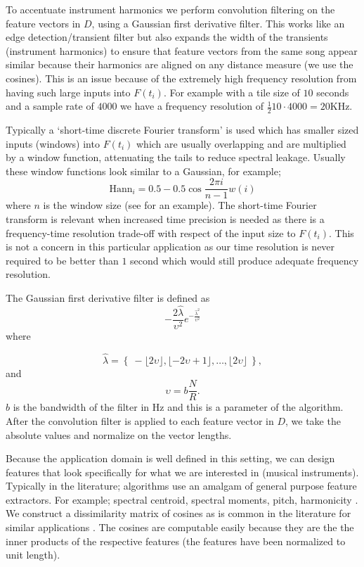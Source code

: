 \documentclass[twocolumn]{article}
\begin{document}
	To accentuate instrument harmonics we perform convolution filtering on the feature vectors in $D$, using a Gaussian first derivative filter. This works like an edge detection/transient filter but also expands the width of the transients (instrument harmonics) to ensure that feature vectors from the same song appear similar because their harmonics are aligned on any distance measure (we use the cosines). This is an issue because of the extremely high frequency resolution from having such large inputs into $F(t_i)$. For example with a tile size of $10$ seconds and a sample rate of $4000$ we have a frequency resolution of $\frac{1}{2}10 \cdot 4000 = 20$KHz. 
	
	Typically a `short-time discrete Fourier transform' is used which has smaller sized inputs (windows) into $F(t_i)$ which are usually overlapping and are multiplied by a window function, attenuating the tails to reduce spectral leakage. Usually these window functions look similar to a Gaussian, for example;  
	\[
	\mathrm{Hann}_i = 0.5 - 0.5 \cos\frac{2\pi i}{n-1}{w(i)}
	\] where $n$ is the window size
	(see \cite{tzanetakis1999multifeature} for an example). The short-time Fourier transform is relevant when increased time precision is needed as there is a frequency-time resolution trade-off with respect of the input size to $F(t_i)$. This is not a concern in this particular application as our time resolution is never required to be better than $1$ second which would still produce adequate frequency resolution.
	
	The Gaussian first derivative filter is defined as 
	$$- \frac{2 \hat{\lambda}}{\upsilon^2}  e^{-\frac{\hat{\lambda}^2}{\upsilon^2}} $$ where 
	
	$$\hat{\lambda}=\left\{~-\lfloor 2\upsilon\rfloor,\lfloor-2\upsilon+1\rfloor,\ldots, \lfloor 2 \upsilon \rfloor~\right\},$$ and $$\upsilon = b  \frac{N}{R} .$$ $b$ is the bandwidth of the filter in Hz and this is a parameter of the algorithm. After the convolution filter is applied to each feature vector in $D$, we take the absolute values and normalize on the vector lengths.  
	
	Because the application domain is well defined in this setting, we can design features that look specifically for what we are interested in (musical instruments). Typically in the literature; algorithms use an amalgam of general purpose feature extractors. For example; spectral centroid, spectral moments, pitch, harmonicity \cite{tzanetakis1999framework}. We construct a dissimilarity matrix of cosines as is common in the literature for similar applications \cite{foote1999visualizing}. The cosines are computable easily because they are the the inner products of the respective features (the features have been normalized to unit length).
	
\end{document}
